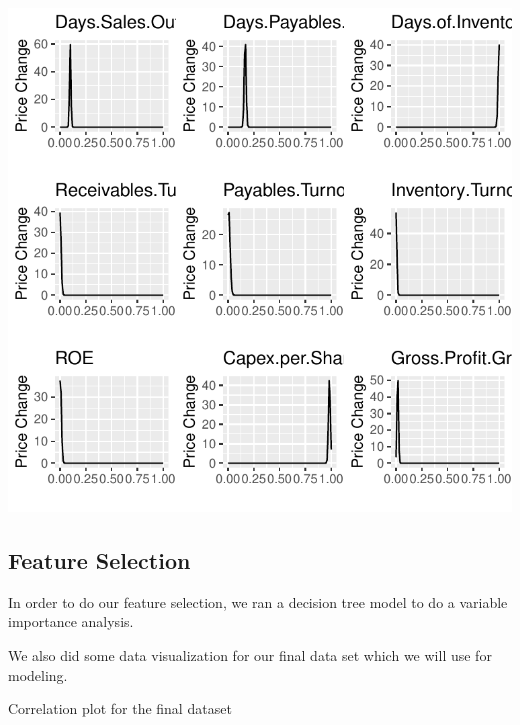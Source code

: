 \documentclass[11pt,]{article}
\newenvironment{Shaded}{\begin{snugshade}}{\end{snugshade}}
\newcommand{\CommentTok}[1]{\textcolor[rgb]{0.56,0.35,0.01}{\textit{#1}}}
\begin{document}
\begin{center}\includegraphics{stock_analysis_files/figure-latex/data normal distribution plot6-1} \end{center}

\hypertarget{feature-selection-1}{%
\subsection{Feature Selection}\label{feature-selection-1}}

In order to do our feature selection, we ran a decision tree model to do
a variable importance analysis.

\begin{Shaded}
\end{Shaded}

We also did some data visualization for our final data set which we will
use for modeling.

Correlation plot for the final dataset
\end{document}
